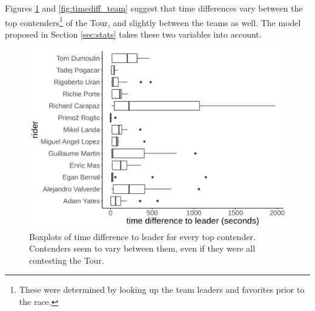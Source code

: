 \documentclass[aos,preprint]{imsart}
\begin{document}

Figures \ref{fig:timediff_contender} and \ref{fig:timediff_team} suggest that time differences vary between the top contenders\footnote{These were determined by looking up the team leaders and favorites prior to the race.} of the Tour, and slightly between the teams as well. The model proposed in Section \ref{sec:stats} takes these two variables into account.


\begin{figure}[h]
  \centering
  \includegraphics[scale=0.5]{fig/timediff_contender.png}
  \caption{Boxplots of time difference to leader for every top contender. Contenders seem to vary between them, even if they were all contesting the Tour.}
  \label{fig:timediff_contender}
\end{figure}
\end{document}
